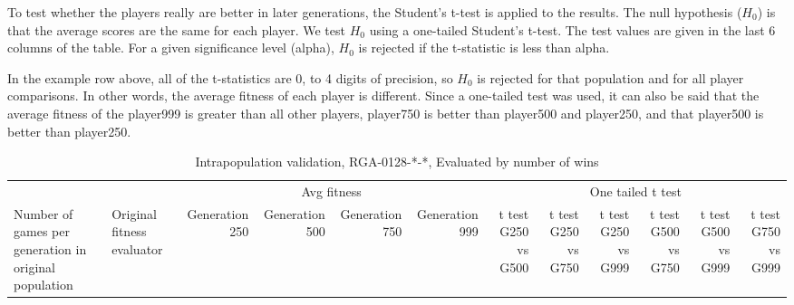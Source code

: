 \begin{landscape}
To test whether the players really are better in later generations, the
Student's t-test is applied to the results. The null hypothesis ($H_{0}$) is
that the average scores are the same for each player. We test $H_{0}$ using a
one-tailed Student's t-test. The test values are given in the last 6 columns of
the table. For a given significance level (alpha), $H_{0}$ is rejected if the
t-statistic is less than alpha.

In the example row above, all of the t-statistics are 0, to 4 digits of
precision, so $H_{0}$ is rejected for that population and for all player
comparisons. In other words, the average fitness of each player is different.
Since a one-tailed test was used, it can also be said that the average fitness
of the player999 is greater than all other players, player750 is better than
player500 and player250, and that player500 is better than player250.

\clearpage

\begin{table}[ht]
  \centering
    \caption{Intrapopulation validation, RGA-0128-*-*, Evaluated by number of
    wins}
    \begin{tabularx}{\linewidth}{|p{1in}|p{1in}|r|r|r|r|r|r|r|r|r|r|}
\cline{3-12}    \multicolumn{1}{l}{} &  & \multicolumn{4}{c|}{Avg fitness} & \multicolumn{6}{c|}{One tailed t test} \\ \cline{1-12}
    Number of games per generation in original population
    & Original fitness evaluator 
    & \multicolumn{1}{p{0.7in}|}{Generation 250} 
    & \multicolumn{1}{p{0.7in}|}{Generation 500}
    & \multicolumn{1}{p{0.7in}|}{Generation 750}
    & \multicolumn{1}{p{0.7in}|}{Generation 999}
    & \multicolumn{1}{X|}{t test G250 vs G500} 
    & \multicolumn{1}{X|}{t test G250 vs G750}
    & \multicolumn{1}{X|}{t test G250 vs G999}
    & \multicolumn{1}{X|}{t test G500 vs G750}
    & \multicolumn{1}{X|}{t test G500 vs G999}
    & \multicolumn{1}{X|}{t test G750 vs G999} \\ \cline{1-12}


\end{tabularx}
\end{table}
\end{landscape}
